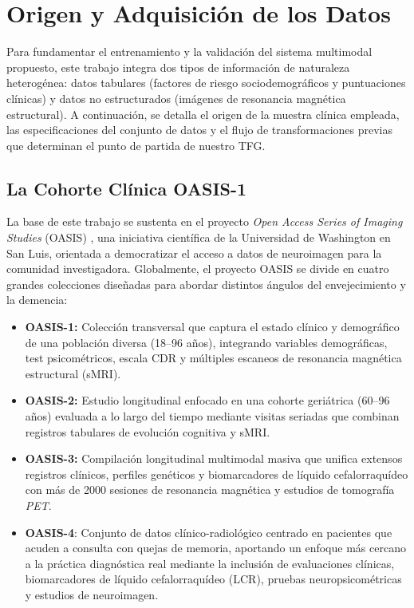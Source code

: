 \documentclass[12pt, oneside, english, spanish]{book}
\begin{document}
\section{Origen y Adquisición de los Datos} \label{sec:origen_datos}

Para fundamentar el entrenamiento y la validación del sistema multimodal propuesto, este trabajo integra dos tipos de información de naturaleza heterogénea: datos tabulares (factores de riesgo sociodemográficos y puntuaciones clínicas) y datos no estructurados (imágenes de resonancia magnética estructural). A continuación, se detalla el origen de la muestra clínica empleada, las especificaciones del conjunto de datos y el flujo de transformaciones previas que determinan el punto de partida de nuestro TFG.

\subsection{La Cohorte Clínica OASIS-1} \label{subsec:cohorte_oasis1}

La base de este trabajo se sustenta en el proyecto \textit{Open Access Series of Imaging Studies} (OASIS) \cite{marcus2007oasis}, una iniciativa científica de la Universidad de Washington en San Luis, orientada a democratizar el acceso a datos de neuroimagen para la comunidad investigadora. Globalmente, el proyecto OASIS se divide en cuatro grandes colecciones diseñadas para abordar distintos ángulos del envejecimiento y la demencia:

\begin{itemize}
	\item \textbf{OASIS-1:} Colección transversal que captura el estado clínico y demográfico de una población diversa (18--96 años), integrando variables demográficas, test psicométricos, escala CDR y múltiples escaneos de resonancia magnética estructural (sMRI).
	
	\item \textbf{OASIS-2:} Estudio longitudinal enfocado en una cohorte geriátrica (60--96 años) evaluada a lo largo del tiempo mediante visitas seriadas que combinan registros tabulares de evolución cognitiva y sMRI.
	
	\item \textbf{OASIS-3:} Compilación longitudinal multimodal masiva que unifica extensos registros clínicos, perfiles genéticos y biomarcadores de líquido cefalorraquídeo con más de 2000 sesiones de resonancia magnética y estudios de tomografía \textit{PET}.
	
	\item \textbf{OASIS-4}: Conjunto de datos clínico-radiológico centrado en pacientes que acuden a consulta con quejas de memoria, aportando un enfoque más cercano a la práctica diagnóstica real mediante la inclusión de evaluaciones clínicas, biomarcadores de líquido cefalorraquídeo (LCR), pruebas neuropsicométricas y estudios de neuroimagen.
\end{itemize}
\end{document}
